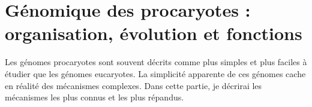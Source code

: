 \chapter{Génomique des procaryotes : organisation, évolution et fonctions}

Les génomes procaryotes sont souvent décrits comme plus simples et plus faciles à étudier que les génomes eucaryotes. La simplicité apparente de ces génomes cache en réalité des mécanismes complexes. Dans cette partie, je décrirai les mécanismes les plus connus et les plus répandus.





